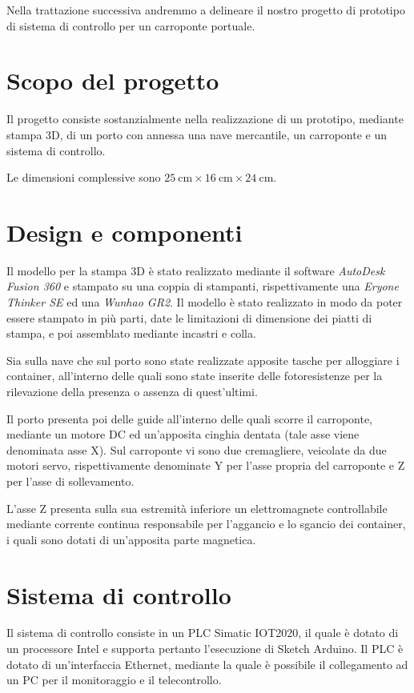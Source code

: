 Nella trattazione successiva andremmo a delineare il nostro progetto di prototipo di sistema di
controllo per un carroponte portuale.

\section{Scopo del progetto}

Il progetto consiste sostanzialmente nella realizzazione di un prototipo, mediante stampa 3D, di un
porto con annessa una nave mercantile, un carroponte e un sistema di controllo.

Le dimensioni complessive sono $\qty{25}{\cm} \times \qty{16}{\cm} \times \qty{24}{\cm}$.

\section{Design e componenti}

Il modello per la stampa 3D è stato realizzato mediante il software \emph{AutoDesk Fusion 360} e
stampato su una coppia di stampanti, rispettivamente una \emph{Eryone Thinker SE} ed una
\emph{Wunhao GR2}. Il modello è stato realizzato in modo da poter essere stampato in più parti, date
le limitazioni di dimensione dei piatti di stampa, e poi assemblato mediante incastri e colla.

Sia sulla nave che sul porto sono state realizzate apposite tasche per alloggiare i container,
all'interno delle quali sono state inserite delle fotoresistenze per la rilevazione della presenza o
assenza di quest'ultimi.

Il porto presenta poi delle guide all'interno delle quali scorre il carroponte, mediante un motore
DC ed un'apposita cinghia dentata (tale asse viene denominata asse X). Sul carroponte vi sono due
cremagliere, veicolate da due motori servo, rispettivamente denominate Y per l'asse propria del
carroponte e Z per l'asse di sollevamento.

L'asse Z presenta sulla sua estremità inferiore un elettromagnete controllabile mediante corrente
continua responsabile per l'aggancio e lo sgancio dei container, i quali sono dotati di un'apposita
parte magnetica.

\section{Sistema di controllo}

Il sistema di controllo consiste in un PLC Simatic IOT2020, il quale è dotato di un processore Intel
e supporta pertanto l'esecuzione di Sketch Arduino. Il PLC è dotato di un'interfaccia Ethernet,
mediante la quale è possibile il collegamento ad un PC per il monitoraggio e il telecontrollo.

